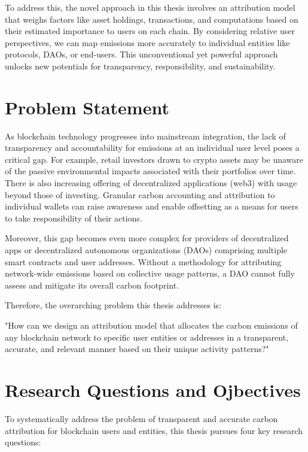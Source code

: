 \documentclass[11pt]{report}
\begin{document}
To address this, the novel approach in this thesis involves an attribution model that weighs factors like asset holdings, transactions, and computations based on their estimated importance to users on each chain. By considering relative user perspectives, we can map emissions more accurately to individual entities like protocols, DAOs, or end-users. This unconventional yet powerful approach unlocks new potentials for transparency, responsibility, and sustainability.

\section{Problem Statement}

As blockchain technology progresses into mainstream integration, the lack of transparency and accountability for emissions at an individual user level poses a critical gap. For example, retail investors drawn to crypto assets may be unaware of the passive environmental impacts associated with their portfolios over time. There is also increasing offering of decentralized applications (web3) with usage beyond those of investing. Granular carbon accounting and attribution to individual wallets can raise awareness and enable offsetting as a means for users to take responsibility of their actions.

Moreover, this gap becomes even more complex for providers of decentralized apps or decentralized autonomous organizations (DAOs) comprising multiple smart contracts and user addresses. Without a methodology for attributing network-wide emissions based on collective usage patterns, a DAO cannot fully assess and mitigate its overall carbon footprint.

Therefore, the overarching problem this thesis addresses is:

"How can we design an attribution model that allocates the carbon emissions of any blockchain network to specific user entities or addresses in a transparent, accurate, and relevant manner based on their unique activity patterns?"


\section{Research Questions and Ojbectives}

To systematically address the problem of transparent and accurate carbon attribution for blockchain users and entities, this thesis pursues four key research questions:
\end{document}
